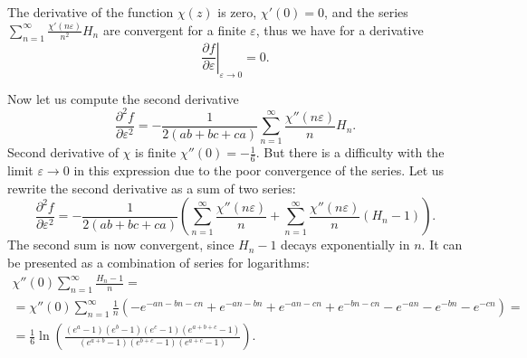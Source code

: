 \documentclass{article}
\begin{document}
The derivative of the function $\chi(z)$ is zero, $\chi'(0)=0$, and the series
$\sum_{n=1}^{\infty} \frac{\chi'(n\varepsilon)}{n^{2}}H_{n}$ are convergent for a finite
$\varepsilon$, thus we have for a derivative
\begin{equation}
  \label{eq:43}
\left.\frac{\partial f}{\partial \varepsilon}\right|_{\varepsilon\to 0}=0.
\end{equation}

Now let us compute the second derivative
\begin{equation}
  \label{eq:44}
\frac{\partial^{2} f}{\partial
  \varepsilon^{2}}=-\frac{1}{2(ab+bc+ca)} \sum _{n=1}^{\infty} \frac{\chi''(n\varepsilon)}{n} H_{n}.  
\end{equation}
Second derivative of $\chi$ is finite $\chi''(0)=-\frac{1}{6}$. But there is a difficulty with the
limit $\varepsilon\to 0$ in this expression due to the poor convergence of the series. Let us
rewrite the second derivative as a sum of two series:
\begin{equation}
  \label{eq:46}
\frac{\partial^{2} f}{\partial
  \varepsilon^{2}}=-\frac{1}{2(ab+bc+ca)} \left(\sum _{n=1}^{\infty} \frac{\chi''(n\varepsilon)}{n}+
  \sum_{n=1}^{\infty} \frac{\chi''(n\varepsilon)}{n}(H_{n}-1)\right).    
\end{equation}
The second sum is now convergent, since $H_{n}-1$ decays exponentially in $n$. It can be presented
as a combination of series for logarithms:
\begin{multline}
  \label{eq:47}
  \chi''(0)\sum_{n=1}^{\infty} \frac{H_{n}-1}{n}=\\=\chi''(0)\sum_{n=1}^{\infty}\frac{1}{n}\left(-e^{-a
      n-b n-c n}+e^{-a n-b n}+e^{-a n-c n}+e^{-b n-c n} - e^{-a n}-e^{-b n}-e^{-c n}\right)=\\
  =\frac{1}{6}\ln\left(\frac{(e^{a}-1)(e^{b}-1)(e^{c}-1)(e^{a+b+c}-1)}{(e^{a+b}-1)(e^{b+c}-1)(e^{a+c}-1)}\right).
\end{multline}
\end{document}
